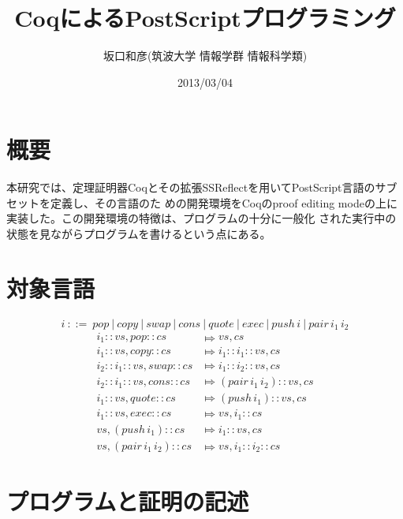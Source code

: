 \documentclass[a4paper, 10.5pt, twocolumn]{ujarticle}
\title{CoqによるPostScriptプログラミング}
\author{坂口和彦(筑波大学 情報学群 情報科学類)}
\date{2013/03/04}
\begin{document}
\maketitle

\section*{概要}

本研究では、定理証明器Coqとその拡張SSReflectを用いてPostScript言語のサブセットを定義し、その言語のた
めの開発環境をCoqのproof editing modeの上に実装した。この開発環境の特徴は、プログラムの十分に一般化
された実行中の状態を見ながらプログラムを書けるという点にある。

\section*{対象言語}

\vspace{-2em}
\[
 i \: ::= \: pop
   \:  |  \: copy
   \:  |  \: swap
   \:  |  \: cons
   \:  |  \: quote
   \:  |  \: exec
   \:  |  \: push \, i
   \:  |  \: pair \, i_1 \, i_2
\]
\vspace{-2em}
\begin{align*}
 i_1 :: vs , \mathit{pop} :: cs           & \Mapsto vs , cs \\[-2mm]
 i_1 :: vs , \mathit{copy} :: cs          & \Mapsto i_1 :: i_1 :: vs , cs \\[-2mm]
 i_2 :: i_1 :: vs , \mathit{swap} :: cs   & \Mapsto i_1 :: i_2 :: vs, cs \\[-2mm]
 i_2 :: i_1 :: vs , \mathit{cons} :: cs   & \Mapsto (\mathit{pair} \, i_1 \, i_2) :: vs , cs \\[-2mm]
 i_1 :: vs , \mathit{quote} :: cs         & \Mapsto (\mathit{push} \, i_1) :: vs , cs \\[-2mm]
 i_1 :: vs , \mathit{exec} :: cs          & \Mapsto vs , i_1 :: cs \\[-2mm]
 vs , (\mathit{push} \, i_1) :: cs        & \Mapsto i_1 :: vs , cs \\[-2mm]
 vs , (\mathit{pair} \, i_1 \, i_2) :: cs & \Mapsto vs , i_1 :: i_2 :: cs
\end{align*}

\section*{プログラムと証明の記述}
\end{document}
